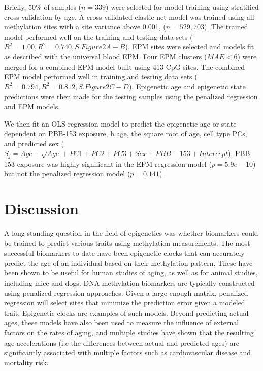 \documentclass{article}
\begin{document}
{\begin{linenumbers}
Briefly, 50\% of samples ($n=339$) were selected for model training using stratified cross validation by age. A 
cross validated elastic net model was trained using all methylation sites with a site variance above 0.001, 
($n=529,703$). The trained model performed well on the training and testing data sets 
($R^2 = 1.00, R^2 = 0.740, S.Figure 2 A-B$). EPM sites were selected and models fit as described with the universal 
blood EPM. Four EPM clusters ($MAE < 6$) were merged for a combined EPM model built using 413 CpG sites. The 
combined EPM model performed well in training and testing data sets ($R^2 = 0.794, R^2 = 0.812, S.Figure 2 C-D$). 
Epigenetic age and epigenetic state predictions were then made for the testing samples using the penalized 
regression and EPM models. 

We then fit an OLS regression model to predict the epigenetic age or state dependent on  PBB-153 exposure, h age, the 
square root of age, cell type PCs, and predicted sex 
($S_j  = Age + \sqrt{Age} + PC1 + PC2 + PC3 + Sex + PBB-153 + Intercept$). PBB-153 exposure was highly significant in 
the EPM regression model ($p=5.9e-10$) but not the penalized regression model ($p=0.141$). 

\section{Discussion}

A long standing question in the field of epigenetics was whether biomarkers could be trained to predict various 
traits using methylation measurements.  The most successful biomarkers to date have been epigenetic clocks that can 
accurately predict the age of an individual based on their methylation pattern. These have been shown to be useful for 
human studies of aging, as well as for animal studies, including mice\cite{Thompson2018-rh} and dogs\cite{Thompson2017-cl}.  
DNA methylation biomarkers are typically constructed using penalized regression approaches.  Given a large enough matrix, 
penalized regression will select sites that minimize the prediction error given a modeled trait. Epigenetic clocks 
are examples of such models.  Beyond predicting actual ages, these models have also been used to measure the influence 
of external factors on the rates of aging, and multiple studies have shown that the resulting age accelerations 
(i.e the differences between actual and predicted ages) are significantly associated with multiple factors such as 
cardiovascular disease\cite{Huang2019-hf} and mortality risk\cite{Marioni2015-sn,Perna2016-pi}.


\end{linenumbers}}
\end{document}
